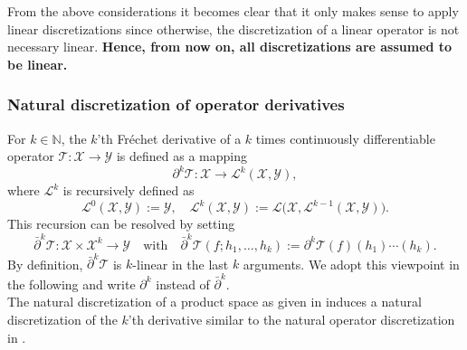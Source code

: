 \documentclass[a4paper]{paper}
\newcommand{\VecSpace}[1]{\mathscr{#1}}
\newcommand{\Natural}{\mathbb{N}}
\newcommand{\Op}[1]{\mathcal{#1}}
\begin{document}
\begin{remark}
 From the above considerations it becomes clear that it only makes sense to apply linear discretizations since otherwise, the 
 discretization of a linear operator is not necessary linear. \textbf{Hence, from now on, all discretizations are assumed to be linear.}
\end{remark}


\subsubsection{Natural discretization of operator derivatives}

For $k \in \Natural$, the $k$'th Fr\'{e}chet derivative of a $k$ times continuously differentiable operator $\Op{T} \colon \VecSpace{X} 
\to \VecSpace{Y}$ is defined as a mapping
%
\begin{equation*}
 \partial^k \Op{T} \colon \VecSpace{X} \to \VecSpace{L}^k(\VecSpace{X}, \VecSpace{Y}),
\end{equation*}
%
where $\VecSpace{L}^k$ is recursively defined as 
%
\begin{equation*}
 \VecSpace{L}^0(\VecSpace{X}, \VecSpace{Y}) := \VecSpace{Y}, \quad 
 \VecSpace{L}^k(\VecSpace{X}, \VecSpace{Y}) := \VecSpace{L}\big( \VecSpace{X}, \VecSpace{L}^{k-1}(\VecSpace{X}, \VecSpace{Y}) \big).
\end{equation*}
%
This recursion can be resolved by setting
%
\begin{equation*}
 \bar\partial^k \Op{T} \colon \VecSpace{X} \times \VecSpace{X}^k \to \VecSpace{Y}
 \quad \text{with} \quad
 \bar\partial^k \Op{T}(f; h_1, \ldots, h_k) := \partial^k\Op{T}(f)(h_1)\cdots(h_k).
\end{equation*}
%
By definition, $\bar\partial^k\Op{T}$ is $k$-linear in the last $k$ arguments. We adopt this viewpoint in the following and write 
$\partial^k$ instead of $\bar\partial^k$.\\
%
The natural discretization of a product space as given in  induces a natural discretization of the 
$k$'th derivative similar to the natural operator discretization in .
\end{document}
